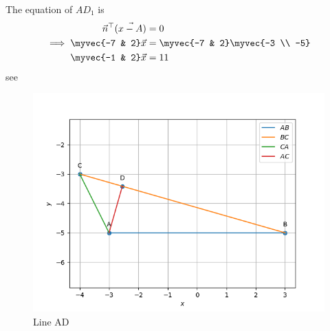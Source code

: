 \documentclass[11pt]{book}
\begin{document}
\begin{enumerate}[label=\thesection.\arabic*.,ref=\thesection.\theenumi]
The equation of $AD_1$ is
\begin{align}
 \vec{n}^{\top}(\vec{x-A}) &= 0 \\
\implies \myvec{-7 & 2}\vec{x} &= \myvec{-7 & 2}\myvec{-3 \\ -5}\\
\myvec{-1 & 2}\vec{x} &= 11
\end{align}
see 
\begin{figure}[H]
    \centering
    \includegraphics{figs/linead.png}
    \caption{Line AD}
    \label{fig:line_ad}
\end{figure}
 

\end{enumerate}
\end{document}
